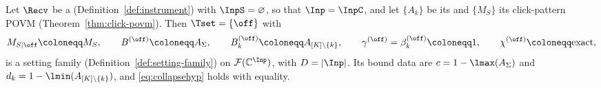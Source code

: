 
\begin{corollary}
\label{cor:unconditioned-family}
Let $\Recv$ be a  (Definition~\ref{def:instrument})
with $\InpS=\varnothing$, so that $\Inp=\InpC$, and let $\{A_k\}$ be its
 and $\{M_S\}$ its click-pattern POVM
(Theorem~\ref{thm:click-povm}). Then $\Tset=\{\off\}$ with
\begin{equation}\label{eq:unconditioned-data}
  M_{S|\off}\coloneqq M_S,\qquad
  B^{(\off)}\coloneqq A_\Sigma,\qquad
  B^{(\off)}_k\coloneqq A_{[K]\setminus\{k\}},\qquad
  \gamma^{(\off)}=\beta^{(\off)}_k\coloneqq1,\qquad
  \chi^{(\off)}\coloneqq\mathrm{exact},
\end{equation}
is a setting family (Definition~\ref{def:setting-family}) on
$\mathcal{F}(\mathbb{C}^{\Inp})$, with $D=|\Inp|$. Its bound data are
$c=1-\lmax(A_\Sigma)$ and $d_k=1-\lmin(A_{[K]\setminus\{k\}})$, and
\eqref{eq:collapsehyp} holds with equality.
\end{corollary}

